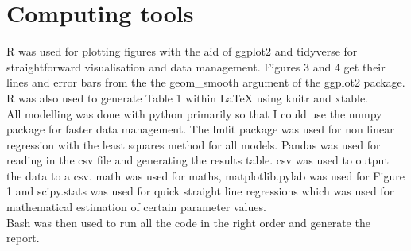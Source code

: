 \documentclass[fontsize=11pt]{scrartcl}\usepackage[]{graphicx}\usepackage[]{color}
\begin{document}
  \section{Computing tools}
  R was used for plotting figures with the aid of ggplot2 and tidyverse for straightforward visualisation and data management. Figures 3 and 4 get their lines and 
  error bars from the the geom\_smooth argument of the ggplot2 package.
  R was also used to generate Table 1 within LaTeX using knitr and xtable. \\
  All modelling was done with python primarily so that I could use the numpy package for faster data management.
   The lmfit package was used for non linear regression with the least 
  squares method for all models. Pandas was used for reading in the csv file and generating the results table. 
  csv was used to output the data to a csv. math was used for maths, matplotlib.pylab was used
  for Figure 1 and scipy.stats was used for quick straight line regressions which was used 
  for mathematical estimation of certain parameter values. \\
  Bash was then used to run all the code in the right order and generate the report.
\end{document}
